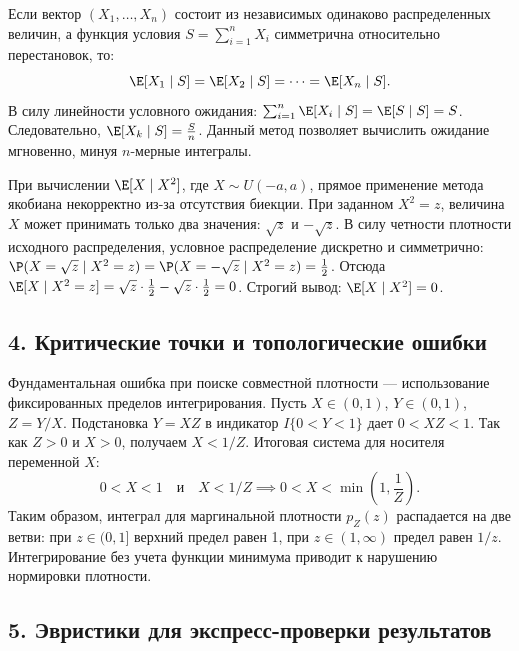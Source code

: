 \begin{HackBox}
Если вектор $(X_1, \dots, X_n)$ состоит из независимых одинаково распределенных величин, а функция условия $S = \sum_{i=1}^n X_i$ симметрична относительно перестановок, то:
\[
    \E[X_1 \mid S] = \E[X_2 \mid S] = \dots = \E[X_n \mid S].
\]
В силу линейности условного ожидания: $\sum_{i=1}^n \E[X_i \mid S] = \E[S \mid S] = S$. Следовательно, $\E[X_k \mid S] = \frac{S}{n}$.
Данный метод позволяет вычислить ожидание мгновенно, минуя $n$-мерные интегралы.
\end{HackBox}

\begin{HackBox}
При вычислении $\E[X \mid X^2]$, где $X \sim U(-a, a)$, прямое применение метода якобиана некорректно из-за отсутствия биекции.
При заданном $X^2 = z$, величина $X$ может принимать только два значения: $\sqrt{z}$ и $-\sqrt{z}$. В силу четности плотности исходного распределения, условное распределение дискретно и симметрично: $\P(X = \sqrt{z} \mid X^2=z) = \P(X = -\sqrt{z} \mid X^2=z) = \frac{1}{2}$. 
Отсюда $\E[X \mid X^2=z] = \sqrt{z} \cdot \frac{1}{2} - \sqrt{z} \cdot \frac{1}{2} = 0$. Строгий вывод: $\E[X \mid X^2] = 0$.
\end{HackBox}

\subsection*{4. Критические точки и топологические ошибки}

\begin{WarningBox}
Фундаментальная ошибка при поиске совместной плотности — использование фиксированных пределов интегрирования.
Пусть $X \in (0,1)$, $Y \in (0,1)$, $Z = Y/X$. Подстановка $Y = XZ$ в индикатор $I\{0 < Y < 1\}$ дает $0 < XZ < 1$.
Так как $Z > 0$ и $X > 0$, получаем $X < 1/Z$. Итоговая система для носителя переменной $X$:
\[
    0 < X < 1 \quad \text{и} \quad X < 1/Z \implies 0 < X < \min\left(1, \frac{1}{Z}\right).
\]
Таким образом, интеграл для маргинальной плотности $p_Z(z)$ распадается на две ветви: при $z \in (0,1]$ верхний предел равен 1, при $z \in (1, \infty)$ предел равен $1/z$. Интегрирование без учета функции минимума приводит к нарушению нормировки плотности.
\end{WarningBox}

\subsection*{5. Эвристики для экспресс-проверки результатов}

